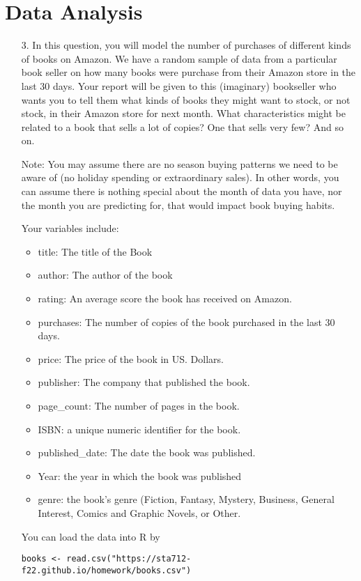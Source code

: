 \documentclass[11pt]{article}
\begin{document}
\newpage

\section*{Data Analysis}

\begin{enumerate}
\item[3.] In this question, you will model the number of purchases of different kinds of books on Amazon. We have a random sample of data from a particular book seller on how many books were purchase from their Amazon store in the last 30 days. Your report will be given to this (imaginary) bookseller who wants you to tell them what kinds of books they might want to stock, or not stock, in their Amazon store for next month. What characteristics might be related to a book that sells a lot of copies? One that sells very few? And so on.

Note: You may assume there are no season buying patterns we need to be aware of (no holiday spending or extraordinary sales). In other words, you can assume there is nothing special about the month of data you have, nor the month you are predicting for, that would impact book buying habits.

Your variables include:
\begin{itemize}
\item title: The title of the Book
\item author: The author of the book
\item rating: An average score the book has received on Amazon.
\item purchases: The number of copies of the book purchased in the last 30 days.
\item price: The price of the book in US. Dollars.
\item publisher: The company that published the book.
\item page\_count: The number of pages in the book.
\item ISBN: a unique numeric identifier for the book.
\item published\_date: The date the book was published.
\item Year: the year in which the book was published
\item genre: the book's genre (Fiction, Fantasy, Mystery, Business, General Interest, Comics and Graphic Novels, or Other.
\end{itemize}

You can load the data into R by
\begin{verbatim}
books <- read.csv("https://sta712-f22.github.io/homework/books.csv")
\end{verbatim}


\end{enumerate}
\end{document}
